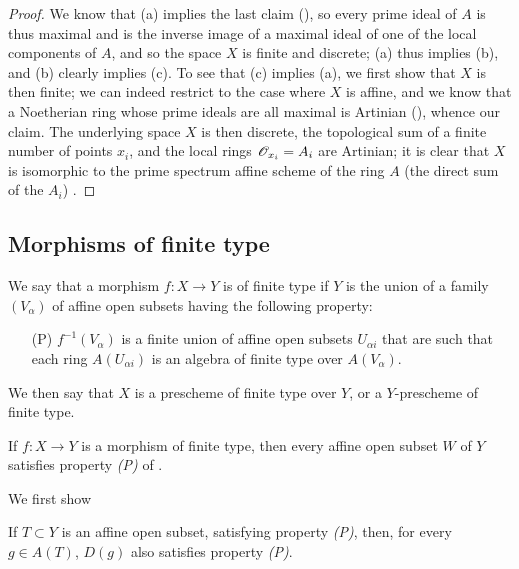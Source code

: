 \begin{proof}
\label{proof-1.6.2.2}
We know that (a) implies the last claim (\cite[p.~205, th.~3]{I-13}), so every prime ideal of $A$ is thus maximal and is the inverse image of a maximal ideal of one of the local components of $A$, and so the space $X$ is finite and discrete;
(a) thus implies (b), and (b) clearly implies (c).
To see that (c) implies (a), we first show that $X$ is then finite;
we can indeed restrict to the case where $X$ is affine, and we know that a Noetherian ring whose prime ideals are all maximal is Artinian (\cite[p.~203]{I-13}), whence our claim.
The underlying space $X$ is then discrete, the topological sum of a finite number of points $x_i$, and the local rings $\mathscr{O}_{x_i}=A_i$ are Artinian;
it is clear that $X$ is isomorphic to the prime spectrum affine scheme of the ring $A$ (the direct sum of the $A_i$) .
\end{proof}

\subsection{Morphisms of finite type}
\label{subsection:morphisms-of-finite-type}

\begin{defn}[6.3.1]
\label{1.6.3.1}
We say that a morphism $f:X\to Y$ is of finite type if $Y$ is the union of a family $(V_\alpha)$ of affine open subsets having the following property:
\begin{enumerate}
  \item[(P)] $f^{-1}(V_\alpha)$ is a finite union of affine open subsets $U_{\alpha i}$ that are such that each ring $A(U_{\alpha i})$ is an algebra of finite type over $A(V_\alpha)$.
\end{enumerate}
We then say that $X$ is a prescheme of finite type over $Y$, or a $Y$-prescheme of finite type.
\end{defn}

\begin{prop}[6.3.2]
\label{1.6.3.2}
If $f:X\to Y$ is a morphism of finite type, then every affine open subset $W$ of $Y$ satisfies property \emph{(P)} of .
\end{prop}

We first show
\begin{lem}[6.3.2.1]
\label{1.6.3.2.1}
If $T\subset Y$ is an affine open subset, satisfying property \emph{(P)}, then, for every $g\in A(T)$, $D(g)$ also satisfies property \emph{(P)}.
\end{lem}

